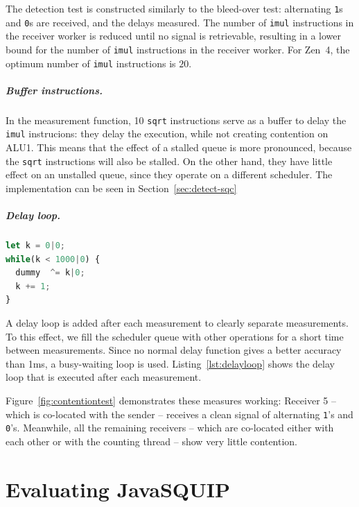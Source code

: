 \documentclass[11pt,
  titlepage=false,
  parskip=half,      %
]{scrreprt}
\begin{document}
The detection test is constructed similarly to the bleed-over test:
alternating \texttt{1}s and \texttt{0}s are received, and the delays measured.
The number of \texttt{imul} instructions in the receiver worker is reduced until no signal is retrievable,
resulting in a lower bound for the number of \texttt{imul} instructions in the receiver worker.
For Zen~4, the optimum number of \texttt{imul} instructions is $20$.

\paragraph{Buffer instructions.}
In the measurement function, 10 \texttt{sqrt} instructions serve as a buffer to delay the \texttt{imul} instrucions:
they delay the execution, while not creating contention on ALU1.
This means that the effect of a stalled queue is more pronounced, because the \texttt{sqrt} instructions will also be stalled.
On the other hand, they have little effect on an unstalled queue, since they operate on a different scheduler.
The implementation can be seen in Section~\ref{sec:detect-sqc}

\paragraph{Delay loop.}
\begin{lstlisting}[float,caption={The delay loop after a measurement},label={lst:delayloop},language=JavaScript]
let k = 0|0;
while(k < 1000|0) {
  dummy  ^= k|0;
  k += 1;
}
\end{lstlisting}

A delay loop is added after each measurement to clearly separate measurements.
To this effect, we fill the scheduler queue with other operations for a short time between measurements.
Since no normal delay function gives a better accuracy than 1ms, a busy-waiting loop is used.
Listing~\ref{lst:delayloop} shows the delay loop that is executed after each measurement.


Figure~\ref{fig:contentiontest} demonstrates these measures working:
Receiver 5 -- which is co-located with the sender -- receives a clean signal of alternating \texttt{1}'s and \texttt{0}'s.
Meanwhile, all the remaining receivers -- which are co-located either with each other or with the counting thread -- show very little contention.


\chapter{Evaluating JavaSQUIP}
\label{ch:evaluation}
\end{document}
